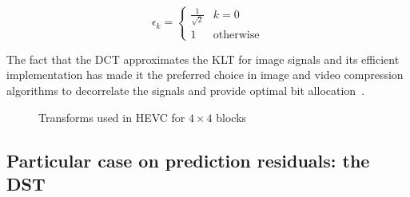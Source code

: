 \documentclass[11pt,a4paper,openright,twoside]{book}
\numberwithin{equation}{section} %
\numberwithin{figure}{section} %
\numberwithin{table}{section} %
\begin{document}
\begin{equation}
	\epsilon_k =
	\begin{cases}
		\frac{1}{\sqrt{2}} & k = 0 \\
		1 & \text{otherwise}
	\end{cases}
\end{equation}

The fact that the \ac{DCT} approximates the \ac{KLT} for image signals and its
efficient implementation has made it the preferred choice in image and video
compression algorithms to decorrelate the signals and provide optimal bit
allocation~\cite{sole-12-transform-coefficient-coding}.

\begin{figure}[tb]
	\centering
	\hspace{0.2\linewidth}
	\caption{Transforms used in \acs{HEVC} for $4\times4$ blocks}
	\label{fig:dct_dst}
\end{figure}

\subsection{Particular case on prediction residuals: the \acs{DST}}
\label{sub:particular_case_dst}
\end{document}
